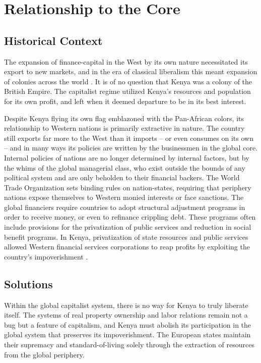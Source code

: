 \documentclass{../../../coursework}
\begin{document}
\section{Relationship to the Core}
\subsection{Historical Context}

The expansion of finance-capital in the West by its own nature necessitated
its export to new markets, and in the era of classical liberalism this meant
expansion of colonies across the world \parencite{Lenin1917}. It is of no
question that Kenya was a colony of the British Empire. The capitalist regime
utilized Kenya's resources and population for its own profit, and left when it
deemed departure to be in its best interest.

Despite Kenya flying its own flag emblazoned with the Pan-African colors, its
relationship to Western nations is primarily extractive in nature. The country
still exports far more to the West than it imports -- or even consumes on its
own -- and in many ways its policies are written by the businessmen in the
global core. Internal policies of nations are no longer determined by internal
factors, but by the whims of the global managerial class, who exist outside
the bounds of any political system and are only beholden to their financial
backers. The World Trade Organization sets binding rules on nation-states,
requiring that periphery nations expose themselves to Western monied interests
or face sanctions. The global financiers require countries to adopt structural
adjustment programs in order to receive money, or even to refinance crippling
debt. These programs often include provisions for the privatization of public
services and reduction in social benefit programs. In Kenya, privatization of
state resources and public services allowed Western financial services
corporations to reap profits by exploiting the country's impoverishment
\parencite{McMichael2004}.


\subsection{Solutions}

Within the global capitalist system, there is no way for Kenya to truly
liberate itself. The systems of real property ownership and labor relations
remain not a bug but a feature of capitalism, and Kenya must abolish its
participation in the global system that preserves its impoverishment. The
European states maintain their supremacy and standard-of-living solely through
the extraction of resources from the global periphery.
\end{document}

